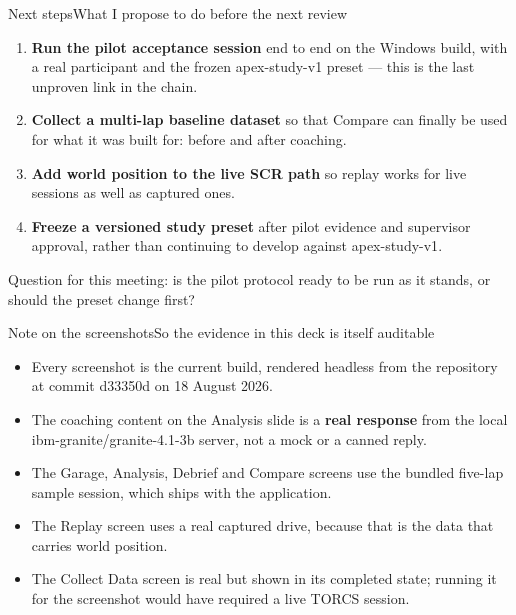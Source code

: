 \documentclass[aspectratio=169,10pt]{beamer}
\newcommand{\kw}[1]{\textcolor{cblue}{\textbf{#1}}}
\newcommand{\code}[1]{{\ttfamily\small #1}}
\begin{document}
\begin{frame}{Next steps}{What I propose to do before the next review}
  \begin{enumerate}\itemsep6pt
    \item \kw{Run the pilot acceptance session} end to end on the Windows build,
          with a real participant and the frozen \code{apex-study-v1} preset ---
          this is the last unproven link in the chain.
    \item \kw{Collect a multi-lap baseline dataset} so that Compare can finally
          be used for what it was built for: before and after coaching.
    \item \kw{Add world position to the live SCR path} so replay works for live
          sessions as well as captured ones.
    \item \kw{Freeze a versioned study preset} after pilot evidence and
          supervisor approval, rather than continuing to develop against
          \code{apex-study-v1}.
  \end{enumerate}
  \vspace{0.8em}
  {\footnotesize\color{cgray}Question for this meeting: is the pilot protocol ready
  to be run as it stands, or should the preset change first?}
\end{frame}

\begin{frame}{Note on the screenshots}{So the evidence in this deck is itself auditable}
  \small
  \begin{itemize}\itemsep4pt
    \item Every screenshot is the current build, rendered headless from the
          repository at commit \code{d33350d} on 18 August 2026.
    \item The coaching content on the Analysis slide is a
          \kw{real response} from the local \code{ibm-granite/granite-4.1-3b}
          server, not a mock or a canned reply.
    \item The Garage, Analysis, Debrief and Compare screens use the bundled
          five-lap sample session, which ships with the application.
    \item The Replay screen uses a real captured drive, because that is the data
          that carries world position.
    \item The Collect Data screen is real but shown in its completed state;
          running it for the screenshot would have required a live TORCS session.
  \end{itemize}
\end{frame}
\end{document}
